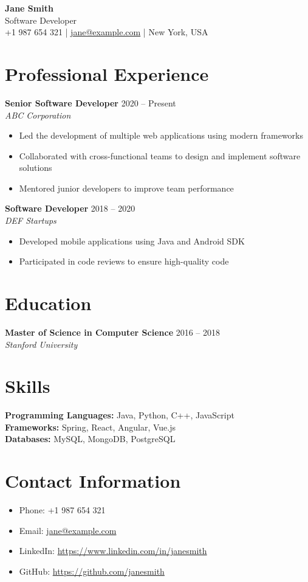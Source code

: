 \documentclass[11pt,a4paper]{article}
\begin{document}
\begin{center}
    {\Huge\textbf{Jane Smith}}\\[0.4cm]
    {\large Software Developer}\\[0.3cm]
    +1 987 654 321 | \href{mailto:jane@example.com}{jane@example.com} | New York, USA
\end{center}

\section{Professional Experience}
\textbf{Senior Software Developer} \hfill 2020 -- Present\\
\textit{ABC Corporation}
\begin{itemize}[noitemsep, topsep=3pt]
    \item Led the development of multiple web applications using modern frameworks
    \item Collaborated with cross-functional teams to design and implement software solutions
    \item Mentored junior developers to improve team performance
\end{itemize}
\textbf{Software Developer} \hfill 2018 -- 2020\\
\textit{DEF Startups}
\begin{itemize}[noitemsep, topsep=3pt]
    \item Developed mobile applications using Java and Android SDK
    \item Participated in code reviews to ensure high-quality code
\end{itemize}

\section{Education}
\textbf{Master of Science in Computer Science} \hfill 2016 -- 2018\\
\textit{Stanford University}

\section{Skills}
\textbf{Programming Languages:} Java, Python, C++, JavaScript\\
\textbf{Frameworks:} Spring, React, Angular, Vue.js\\
\textbf{Databases:} MySQL, MongoDB, PostgreSQL

\section{Contact Information}
\begin{itemize}[noitemsep, topsep=3pt]
    \item Phone: +1 987 654 321
    \item Email: \href{mailto:jane@example.com}{jane@example.com}
    \item LinkedIn: \href{https://www.linkedin.com/in/janesmith}{https://www.linkedin.com/in/janesmith}
    \item GitHub: \href{https://github.com/janesmith}{https://github.com/janesmith}
\end{itemize}
\end{document}
